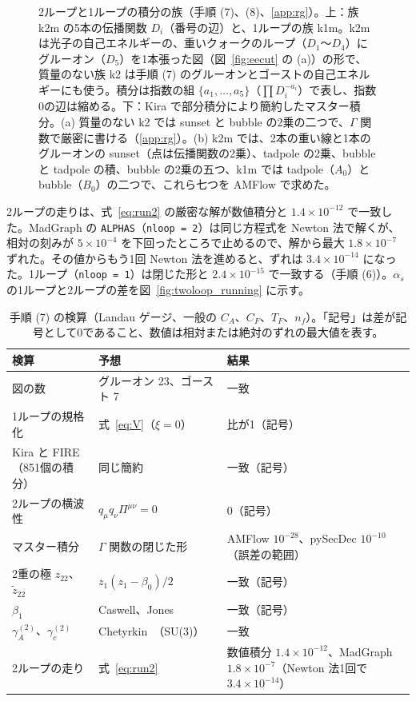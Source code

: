 \documentclass[a4paper,10pt]{ltjsarticle}
\begin{document}
\begin{figure}[tbp]
\caption{2ループと1ループの積分の族（手順 (7)、(8)、\ref{app:rg}）。上：族 k2m の5本の伝播関数 $D_i$（番号の辺）と、1ループの族 k1m。k2m は光子の自己エネルギーの、重いクォークのループ（$D_1$〜$D_4$）にグルーオン（$D_5$）を1本張った図（図~\ref{fig:eecut} の (a)）の形で、質量のない族 k2 は手順 (7) のグルーオンとゴーストの自己エネルギーにも使う。積分は指数の組 $\{a_1,\dots,a_5\}$（$\prod D_i^{-a_i}$）で表し、指数0の辺は縮める。下：Kira で部分積分により簡約したマスター積分。(a) 質量のない k2 では sunset と bubble の2乗の二つで、$\Gamma$ 関数で厳密に書ける（\ref{app:rg}）。(b) k2m では、2本の重い線と1本のグルーオンの sunset（点は伝播関数の2乗）、tadpole の2乗、bubble と tadpole の積、bubble の2乗の五つ、k1m では tadpole（$A_0$）と bubble（$B_0$）の二つで、これら七つを AMFlow で求めた。}
\label{fig:families2}
\end{figure}

2ループの走りは、式~\eqref{eq:run2} の厳密な解が数値積分と $1.4\times10^{-12}$ で一致した。MadGraph の \texttt{ALPHAS}（\texttt{nloop = 2}）は同じ方程式を Newton 法で解くが、相対の刻みが $5\times10^{-4}$ を下回ったところで止めるので、解から最大 $1.8\times10^{-7}$ ずれた。その値からもう1回 Newton 法を進めると、ずれは $3.4\times10^{-14}$ になった。1ループ（\texttt{nloop = 1}）は閉じた形と $2.4\times10^{-15}$ で一致する（手順 (6)）。$\alpha_s$ の1ループと2ループの差を図~\ref{fig:twoloop_running} に示す。

\begin{table}[tbp]
\centering\small
\caption{手順 (7) の検算（Landau ゲージ、一般の $C_A$、$C_F$、$T_F$、$n_f$）。「記号」は差が記号として0であること、数値は相対または絶対のずれの最大値を表す。}
\label{tab:twoloop}
\begin{tabular}{llp{6.6cm}}
\toprule
検算 & 予想 & 結果 \\
\midrule
図の数 & グルーオン 23、ゴースト 7 & 一致 \\
1ループの規格化 & 式~\eqref{eq:V}（$\xi=0$） & 比が1（記号） \\
Kira と FIRE（851個の積分） & 同じ簡約 & 一致（記号） \\
2ループの横波性 & $q_\mu q_\nu\Pi^{\mu\nu}=0$ & 0（記号） \\
マスター積分 & $\Gamma$ 関数の閉じた形 & AMFlow $10^{-28}$、pySecDec $10^{-10}$（誤差の範囲） \\
2重の極 $z_{22}$、$\tilde z_{22}$ & $z_1(z_1-\beta_0)/2$ & 一致（記号） \\
$\beta_1$ & Caswell、Jones~\cite{caswell74,jones74} & 一致（記号） \\
$\gamma_A^{(2)}$、$\gamma_c^{(2)}$ & Chetyrkin~\cite{chetyrkin05}（SU(3)） & 一致 \\
2ループの走り & 式~\eqref{eq:run2} & 数値積分 $1.4\times10^{-12}$、MadGraph $1.8\times10^{-7}$（Newton 法1回で $3.4\times10^{-14}$） \\
\bottomrule
\end{tabular}
\end{table}
\end{document}
